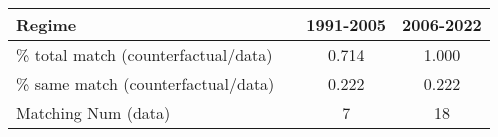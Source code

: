 
\begin{tabular}[t]{lccc}
\toprule
Regime &  & 1991-2005 & 2006-2022\\
\midrule
\% total match (counterfactual/data) &  & 0.714 & 1.000\\
\% same match (counterfactual/data) &  & 0.222 & 0.222\\
Matching Num (data) &  & 7 & 18\\
\bottomrule
\end{tabular}
